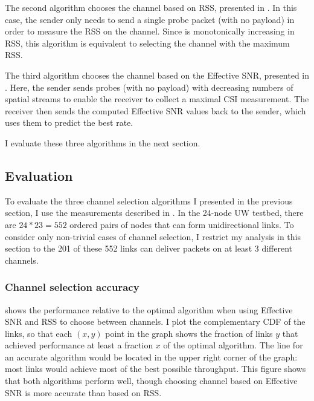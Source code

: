 The second algorithm chooses the channel based on RSS, presented in . In this case, the sender only needs to send a single probe packet (with no payload) in order to measure the RSS on the channel. Since  is monotonically increasing in RSS, this algorithm is equivalent to selecting the channel with the maximum RSS\@.

The third algorithm chooses the channel based on the Effective SNR, presented in . Here, the sender sends probes (with no payload) with decreasing numbers of spatial streams to enable the receiver to collect a maximal CSI measurement. The receiver then sends the computed Effective SNR values back to the sender, which uses them to predict the best rate.

I evaluate these three algorithms in the next section.

\subsection{Evaluation}
To evaluate the three channel selection algorithms I presented in the previous section, I use the measurements described in . In the 24-node UW testbed, there are $24*23=552$ ordered pairs of nodes that can form unidirectional links. To consider only non-trivial cases of channel selection, I restrict my analysis in this section to the 201 of these 552 links can deliver packets on at least 3 different channels.

\subsubsection{Channel selection accuracy}
 shows the performance relative to the optimal algorithm when using Effective SNR and RSS to choose between channels. I plot the complementary CDF of the links, so that each $(x,y)$ point in the graph shows the fraction of links $y$ that achieved performance at least a fraction $x$ of the optimal algorithm. The line for an accurate algorithm would be located in the upper right corner of the graph: most links would achieve most of the best possible throughput. This figure shows that both algorithms perform well, though choosing channel based on Effective SNR is more accurate than based on RSS\@.

